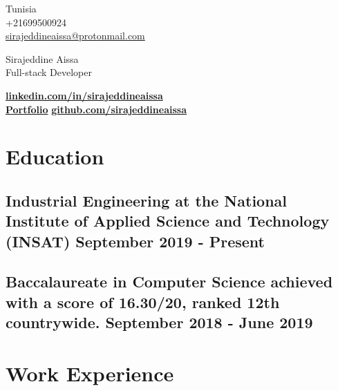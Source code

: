 \documentclass[a4,10pt]{article}
\begin{document}
\begin{center}
    \begin{minipage}[b]{0.24\textwidth}
            \large Tunisia \\
            \large +21699500924 \\
            \large \href{mailto:sirajeddineaissa@protonmail.com}{sirajeddineaissa@protonmail.com} 
    \end{minipage}%
    \begin{minipage}[b]{0.5\textwidth}
            \centering
            {\HUGE Sirajeddine Aissa} \\ %
            \vspace{0.1cm}
            {\color{UI_blue} \Large{Full-stack Developer}} \\
    \end{minipage}%
    \begin{minipage}[b]{0.24\textwidth}
            \flushright \large  %
            {\href{https://www.linkedin.com/in/sirajeddineaissa}{\small \textbf {linkedin.com/in/sirajeddineaissa}} } \\
            \href{https://sirajeddineaissa.vercel.app}{\small \textbf {Portfolio}}
            \href{https://github.com/sirajeddineaissa}{\small \textbf {github.com/sirajeddineaissa}}
    \end{minipage}   
    
\vspace{-0.15cm} 
\end{center}


\section{Education }
\subsection*{Industrial Engineering {\normalsize \normalfont   at the National Institute of Applied Science and Technology (INSAT)} \hfill September 2019 - Present} 
\vspace{0.1cm}
\subsection*{Baccalaureate in Computer Science {\normalsize \normalfont   achieved with a score of 16.30/20, ranked 12th countrywide. } \hfill September 2018 - June 2019} 
\vspace{0.2cm}


\section{Work Experience}
\end{document}
